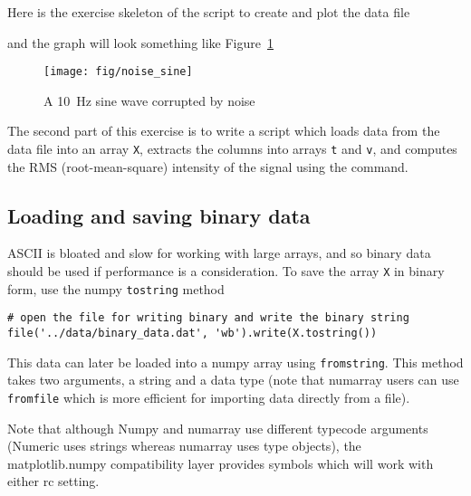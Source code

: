 Here is the exercise skeleton of the script to create and plot the
data file



and the graph will look something like Figure~\ref{fig:noisy_sine}

\begin{center}%
\begin{figure}
\begin{centering}\texttt{[image: fig/noise\_sine]}\par\end{centering}


\caption{\label{fig:noisy_sine}A 10~Hz sine wave corrupted by noise}
\end{figure}
\par\end{center}

The second part of this exercise is to write a script which loads data
from the data file into an array \texttt{X}, extracts the columns into
arrays \texttt{t} and \texttt{v}, and computes the RMS
(root-mean-square) intensity of the signal using the 
command.


\subsection{Loading and saving binary data}
\label{sec:binary_data}

ASCII is bloated and slow for working with large arrays, and so binary
data should be used if performance is a consideration.  To save the
array \texttt{X} in binary form, use the numpy \texttt{tostring} method

\begin{lstlisting}
# open the file for writing binary and write the binary string
file('../data/binary_data.dat', 'wb').write(X.tostring())
\end{lstlisting}

\noindent This data can later be loaded into a numpy array using
\texttt{fromstring}.  This method takes two arguments, a string and a
data type (note that numarray users can use \texttt{fromfile} which is
more efficient for importing data directly from a file).  



\noindent Note that although Numpy and numarray use different
typecode arguments (Numeric uses strings whereas numarray uses type
objects), the matplotlib.numpy compatibility layer provides symbols
which will work with either  rc setting.

